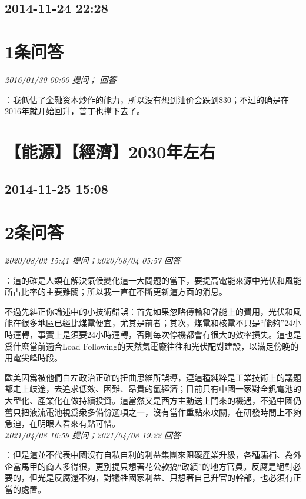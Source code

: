 \documentclass[twocolumn]{ctexart}
\begin{document}
\subsection{2014-11-24 22:28}


\section{1条问答}

\textit{\hfill\noindent\small 2016/01/30 00:00 提问； 回答}

：我低估了金融资本炒作的能力，所以没有想到油价会跌到\$30；不过的确是在2016年就开始回升，普丁也撑下去了。\\


\section{【能源】【經濟】2030年左右}
\subsection{2014-11-25 15:08}


\section{2条问答}

\textit{\hfill\noindent\small 2020/08/02 15:41 提问；2020/08/04 05:57 回答}

：這的確是人類在解決氣候變化這一大問題的當下，要提高電能來源中光伏和風能所占比率的主要難關；所以我一直在不斷更新這方面的消息。

不過先糾正你論述中的小技術錯誤：首先如果忽略傳輸和儲能上的費用，光伏和風能在很多地區已經比煤電便宜，尤其是前者；其次，煤電和核電不只是“能夠”24小時運轉，事實上是須要24小時運轉，否則每次停機都會有很大的效率損失。這也是爲什麽當前適合Load Following的天然氣電廠往往和光伏配對建設，以滿足傍晚的用電尖峰時段。

歐美因爲被他們白左政治正確的扭曲思維所誤導，連這種純粹是工業技術上的議題都走上歧途，去追求低效、困難、昂貴的氫經濟；目前只有中國一家對全釩電池的大型化、產業化在做持續投資。這當然又是西方主動送上門來的機遇，不過中國仍舊只把液流電池視爲衆多備份選項之一，沒有當作重點來攻關，在研發時間上不夠急迫，在明眼人看來有點可惜。
\\

\textit{\hfill\noindent\small 2021/04/08 16:59 提问；2021/04/08 19:22 回答}

：但是這並不代表中國沒有自私自利的利益集團來阻礙產業升級，各種騙補、為外企當馬甲的商人多得很，更別提只想著花公款搞“政績”的地方官員。反腐是絕對必要的，但光是反腐還不夠，對犧牲國家利益、只想著自己升官的幹部，也必須有正當的處置。
\\
\end{document}
